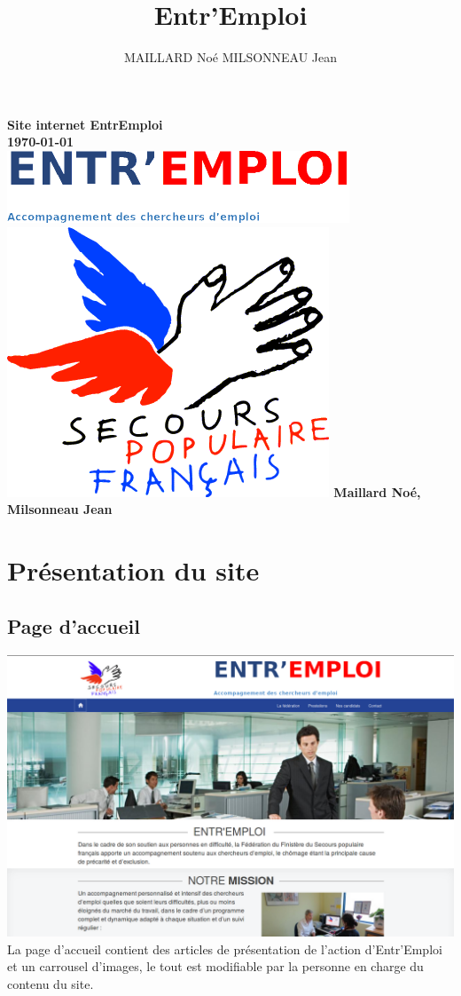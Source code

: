 \documentclass[a4paper, 12pt]{report}
\title{Entr'Emploi}
\author{MAILLARD Noé MILSONNEAU Jean}
\begin{document}
\begin{titlepage}
	\thispagestyle{empty}
    \centering
    {\bfseries\Large
    		Site internet EntrEmploi\\
        \today\\
        \vskip3cm
        \includegraphics{../../public/images/Logo-entremploi-md.png}
        \vskip15mm
        \includegraphics{../../public/images/Logo-spf.png}
        \vskip3cm
        Maillard Noé, Milsonneau Jean\\
    }
    \normalsize
\end{titlepage}

\tableofcontents

\chapter{Présentation du site}
\section{Page d’accueil}
\includegraphics[width=16cm]{homePage.png}
\\
La page d'accueil contient des articles de présentation de l'action d'Entr'Emploi et un carrousel d'images, le tout est modifiable par la personne en charge du contenu du site.
\end{document}

